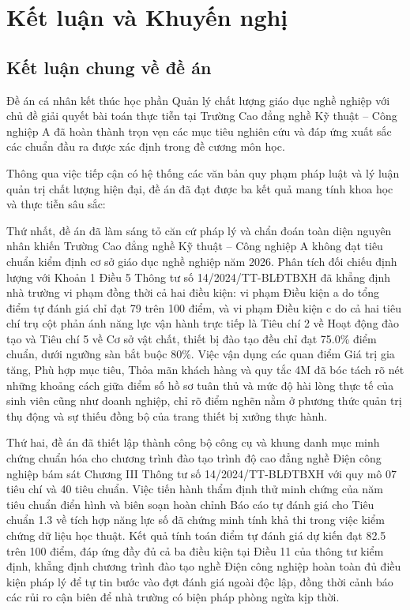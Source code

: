 \section{Kết luận và Khuyến nghị}

\subsection{Kết luận chung về đề án}

Đề án cá nhân kết thúc học phần Quản lý chất lượng giáo dục nghề nghiệp với chủ đề giải quyết bài toán thực tiễn tại Trường Cao đẳng nghề Kỹ thuật -- Công nghiệp A đã hoàn thành trọn vẹn các mục tiêu nghiên cứu và đáp ứng xuất sắc các chuẩn đầu ra được xác định trong đề cương môn học. 

Thông qua việc tiếp cận có hệ thống các văn bản quy phạm pháp luật và lý luận quản trị chất lượng hiện đại, đề án đã đạt được ba kết quả mang tính khoa học và thực tiễn sâu sắc:

Thứ nhất, đề án đã làm sáng tỏ căn cứ pháp lý và chẩn đoán toàn diện nguyên nhân khiến Trường Cao đẳng nghề Kỹ thuật -- Công nghiệp A không đạt tiêu chuẩn kiểm định cơ sở giáo dục nghề nghiệp năm 2026. Phân tích đối chiếu định lượng với Khoản 1 Điều 5 Thông tư số 14/2024/TT-BLĐTBXH đã khẳng định nhà trường vi phạm đồng thời cả hai điều kiện: vi phạm Điều kiện a do tổng điểm tự đánh giá chỉ đạt 79 trên 100 điểm, và vi phạm Điều kiện c do cả hai tiêu chí trụ cột phản ánh năng lực vận hành trực tiếp là Tiêu chí 2 về Hoạt động đào tạo và Tiêu chí 5 về Cơ sở vật chất, thiết bị đào tạo đều chỉ đạt 75.0\% điểm chuẩn, dưới ngưỡng sàn bắt buộc 80\%. Việc vận dụng các quan điểm Giá trị gia tăng, Phù hợp mục tiêu, Thỏa mãn khách hàng và quy tắc 4M đã bóc tách rõ nét những khoảng cách giữa điểm số hồ sơ tuân thủ và mức độ hài lòng thực tế của sinh viên cũng như doanh nghiệp, chỉ rõ điểm nghẽn nằm ở phương thức quản trị thụ động và sự thiếu đồng bộ của trang thiết bị xưởng thực hành.

Thứ hai, đề án đã thiết lập thành công bộ công cụ và khung danh mục minh chứng chuẩn hóa cho chương trình đào tạo trình độ cao đẳng nghề Điện công nghiệp bám sát Chương III Thông tư số 14/2024/TT-BLĐTBXH với quy mô 07 tiêu chí và 40 tiêu chuẩn. Việc tiến hành thẩm định thử minh chứng của năm tiêu chuẩn điển hình và biên soạn hoàn chỉnh Báo cáo tự đánh giá cho Tiêu chuẩn 1.3 về tích hợp năng lực số đã chứng minh tính khả thi trong việc kiểm chứng dữ liệu học thuật. Kết quả tính toán điểm tự đánh giá dự kiến đạt 82.5 trên 100 điểm, đáp ứng đầy đủ cả ba điều kiện tại Điều 11 của thông tư kiểm định, khẳng định chương trình đào tạo nghề Điện công nghiệp hoàn toàn đủ điều kiện pháp lý để tự tin bước vào đợt đánh giá ngoài độc lập, đồng thời cảnh báo các rủi ro cận biên để nhà trường có biện pháp phòng ngừa kịp thời.

